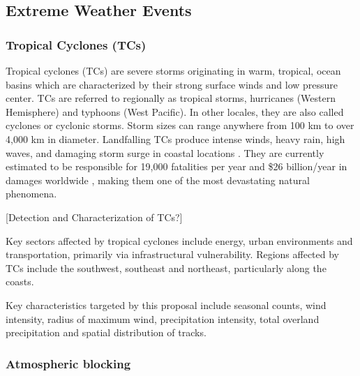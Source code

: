 \documentclass[11pt]{article}
\begin{document}


\subsection{Extreme Weather Events} \label{sec:ExtremeWeather}

\subsubsection{Tropical Cyclones (TCs)}

Tropical cyclones (TCs) are severe storms originating in warm, tropical, ocean basins which are characterized by their strong surface winds and low pressure center. TCs are referred to regionally as tropical storms, hurricanes (Western Hemisphere) and typhoons (West Pacific). In other locales, they are also called cyclones or cyclonic storms. Storm sizes can range anywhere from 100 km to over 4,000 km in diameter. Landfalling TCs produce intense winds, heavy rain, high waves, and damaging storm surge in coastal locations \citep{EmanuelDivineWind}. They are currently estimated to be responsible for 19,000 fatalities per year and \$26 billion/year in damages worldwide \citep{Mendelsohn2012}, making them one of the most devastating natural phenomena.

{\color{red}[Detection and Characterization of TCs?]}

Key sectors affected by tropical cyclones include energy, urban environments and transportation, primarily via infrastructural vulnerability.  Regions affected by TCs include the southwest, southeast and northeast, particularly along the coasts.

Key characteristics targeted by this proposal include seasonal counts, wind intensity, radius of maximum wind, precipitation intensity, total overland precipitation and spatial distribution of tracks.

\subsubsection{Atmospheric blocking}
\end{document}
